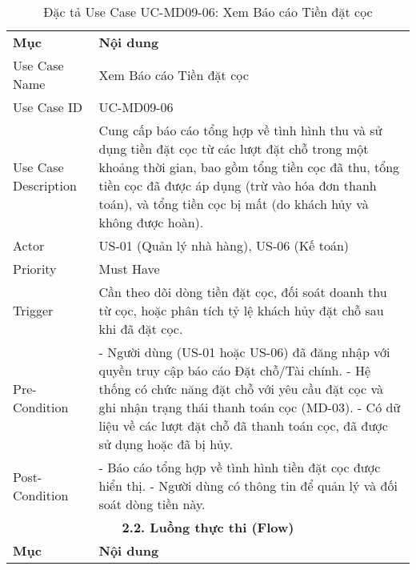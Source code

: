 \begin{longtable}{|m{4cm}|p{11cm}|}
\caption{Đặc tả Use Case UC-MD09-06: Xem Báo cáo Tiền đặt cọc} \label{tab:uc_md09_06} \\
\hline

\endhead %
\hline
\endfoot %
\hline
\endlastfoot %
\multicolumn{2}{|c|}{\textbf{2.1. Tóm tắt (Summary)}} \\
\hline
\textbf{Mục} & \textbf{Nội dung} \\
\hline
Use Case Name & Xem Báo cáo Tiền đặt cọc \\
\hline
Use Case ID & UC-MD09-06 \\
\hline
Use Case Description & Cung cấp báo cáo tổng hợp về tình hình thu và sử dụng tiền đặt cọc từ các lượt đặt chỗ trong một khoảng thời gian, bao gồm tổng tiền cọc đã thu, tổng tiền cọc đã được áp dụng (trừ vào hóa đơn thanh toán), và tổng tiền cọc bị mất (do khách hủy và không được hoàn). \\
\hline
Actor & US-01 (Quản lý nhà hàng), US-06 (Kế toán) \\
\hline
Priority & Must Have \\
\hline
Trigger & Cần theo dõi dòng tiền đặt cọc, đối soát doanh thu từ cọc, hoặc phân tích tỷ lệ khách hủy đặt chỗ sau khi đã đặt cọc. \\
\hline
Pre-Condition & - Người dùng (US-01 hoặc US-06) đã đăng nhập với quyền truy cập báo cáo Đặt chỗ/Tài chính. \newline - Hệ thống có chức năng đặt chỗ với yêu cầu đặt cọc và ghi nhận trạng thái thanh toán cọc (MD-03). \newline - Có dữ liệu về các lượt đặt chỗ đã thanh toán cọc, đã được sử dụng hoặc đã bị hủy. \\
\hline
Post-Condition & - Báo cáo tổng hợp về tình hình tiền đặt cọc được hiển thị. \newline - Người dùng có thông tin để quản lý và đối soát dòng tiền này. \\
\hline
\multicolumn{2}{|c|}{\textbf{2.2. Luồng thực thi (Flow)}} \\
\hline
\textbf{Mục} & \textbf{Nội dung} \\
\hline

\end{longtable}
